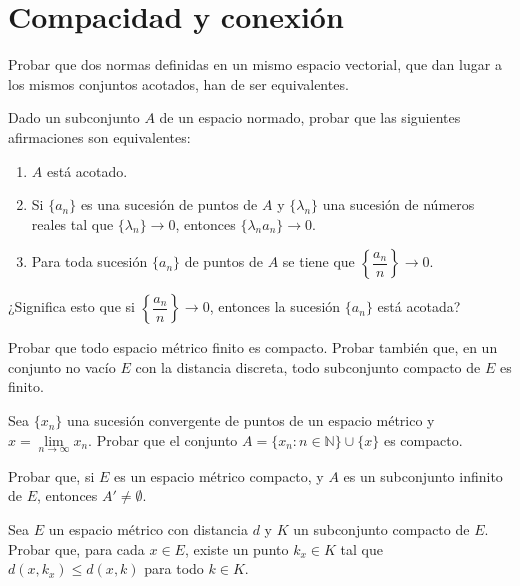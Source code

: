 \section{Compacidad y conexión}


\begin{ejercicio}
Probar que dos normas definidas en un mismo espacio vectorial, que dan lugar a los mismos conjuntos acotados, han de ser equivalentes.
\end{ejercicio}

\begin{ejercicio}
Dado un subconjunto \( A \) de un espacio normado, probar que las siguientes afirmaciones son equivalentes:
    \begin{enumerate}
        \item \( A \) está acotado.
        \item Si \( \{a_n\} \) es una sucesión de puntos de \( A \) y \( \{\lambda_n\} \) una sucesión de números reales tal que \( \{\lambda_n\} \rightarrow 0 \), entonces \( \{\lambda_n  a_n\} \rightarrow 0 \).
        \item Para toda sucesión \( \{a_n\} \) de puntos de \( A \) se tiene que \( \left\{\dfrac{a_n}{n}\right\} \rightarrow 0 \).
    \end{enumerate}
    ¿Significa esto que si \( \left\{\dfrac{a_n}{n}\right\} \rightarrow 0 \), entonces la sucesión \( \{a_n\} \) está acotada?
\end{ejercicio}

\begin{ejercicio}
Probar que todo espacio métrico finito es compacto. Probar también que, en un conjunto no vacío \( E \) con la distancia discreta, todo subconjunto compacto de \( E \) es finito.
\end{ejercicio}

\begin{ejercicio}
Sea \( \{x_n\} \) una sucesión convergente de puntos de un espacio métrico y \( x = \lim\limits_{n \to \infty} x_n \). Probar que el conjunto \( A = \{x_n : n \in \mathbb{N}\} \cup \{x\} \) es compacto.
\end{ejercicio}

\begin{ejercicio}
Probar que, si \( E \) es un espacio métrico compacto, y \( A \) es un subconjunto infinito de \( E \), entonces \( A' \neq \emptyset \).
\end{ejercicio}

\begin{ejercicio}
Sea \( E \) un espacio métrico con distancia \( d \) y \( K \) un subconjunto compacto de \( E \). Probar que, para cada \( x \in E \), existe un punto \( k_x \in K \) tal que \( d(x, k_x) \leq d(x, k) \) para todo \( k \in K \).
\end{ejercicio}

